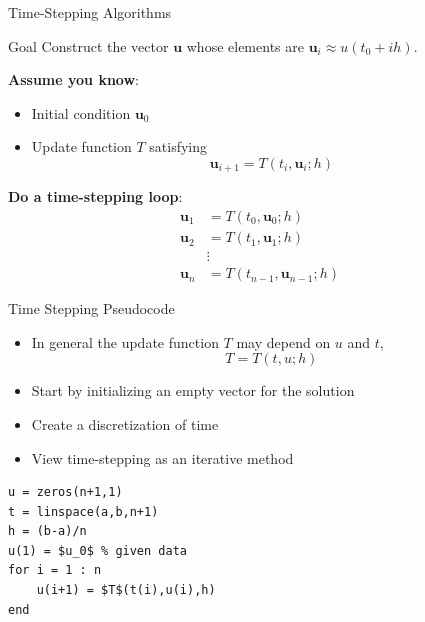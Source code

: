 \documentclass[10pt]{beamer}
\begin{document}
\begin{frame}{Time-Stepping Algorithms}
    \begin{block}{Goal}
        Construct the vector $\textbf{u}$ whose elements are $\textbf{u}_i \approx u(t_0 + ih)$. 
    \end{block}

    \vspace{2mm}
    \textbf{Assume you know}:
    \begin{itemize}
        \item Initial condition $\textbf{u}_0$
        \item Update function $T$ satisfying
        $$\textbf{u}_{i+1}  =   T(t_{i},\textbf{u}_{i};h)$$
    \end{itemize}
    
    \textbf{Do a time-stepping loop}:
        \begin{align*}
            \textbf{u}_1 &=  T(t_{0},\textbf{u}_{0};h) \\ 
            \textbf{u}_2 &= T(t_{1},\textbf{u}_{1};h) \\
                        &\vdots \\
            \textbf{u}_n &= T(t_{n-1},\textbf{u}_{n-1};h) 
        \end{align*}

\end{frame}

\begin{frame}[fragile]{Time Stepping Pseudocode}

\begin{itemize}
    \item In general the update function $T$ may depend on $u$ and $t$, 
        $$T = T(t,u;h)$$

    \item Start by initializing an empty vector for the solution 
    \item Create a discretization of time 
    \item View time-stepping as an iterative method
\end{itemize}
\begin{lstlisting}[mathescape,label=algo,caption=Simple Time-stepping]
u = zeros(n+1,1)
t = linspace(a,b,n+1)
h = (b-a)/n
u(1) = $u_0$ % given data
for i = 1 : n 
    u(i+1) = $T$(t(i),u(i),h)
end
\end{lstlisting}
\end{frame}
\end{document}
